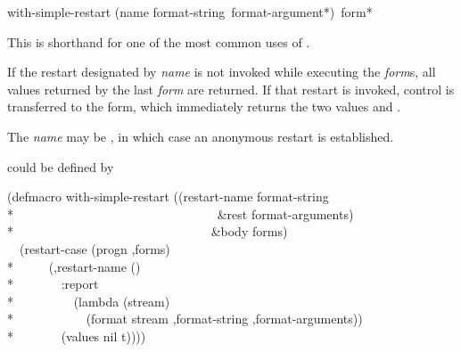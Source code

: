 \begin{defmac}
with-simple-restart (name format-string {\,format-argument}*)
                    {\,form}*

  This is shorthand for one of the most common uses of .

  If the restart designated by {\it name} is not invoked while executing the {\it form\/}s,
  all values returned by the last {\it form} are returned. If that
  restart is invoked, control is transferred to the 
  form, which immediately returns the two values  and .

  The {\it name} may be , in which case an anonymous restart
  is established.

   could be defined by
\begin{lisp}
(defmacro with-simple-restart ((restart-name format-string \\*
~~~~~~~~~~~~~~~~~~~~~~~~~~~~~~~~\&rest format-arguments) \\*
~~~~~~~~~~~~~~~~~~~~~~~~~~~~~~~\&body forms) \\
~~{\Xbq}(restart-case (progn ,{\Xatsign}forms) \\*
~~~~~(,restart-name () \\*
~~~~~~~:report \\*
~~~~~~~~~(lambda (stream) \\*
~~~~~~~~~~~(format stream ,format-string ,{\Xatsign}format-arguments)) \\*
~~~~~~~(values nil t))))
\end{lisp}


\end{defmac}
